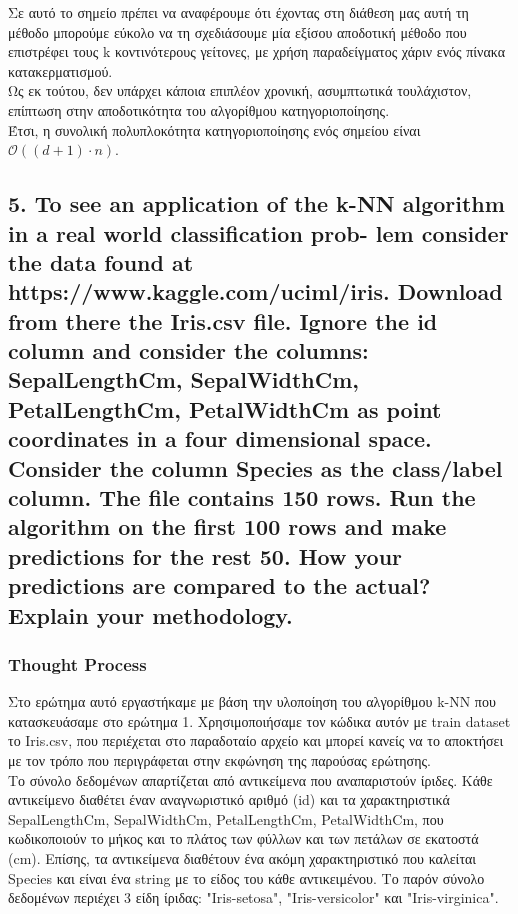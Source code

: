 \documentclass[12pt]{article}
\begin{document}
Σε αυτό το σημείο πρέπει να αναφέρουμε ότι έχοντας στη διάθεση μας
αυτή τη μέθοδο μπορούμε εύκολο να τη σχεδιάσουμε μία εξίσου αποδοτική μέθοδο
που επιστρέφει τους k κοντινότερους γείτονες, με χρήση
παραδείγματος χάριν ενός πίνακα κατακερματισμού. \\

Ως εκ τούτου, δεν υπάρχει κάποια επιπλέον χρονική,
ασυμπτωτικά τουλάχιστον, επίπτωση στην αποδοτικότητα του αλγορίθμου
κατηγοριοποίησης. \\

Έτσι, η συνολική πολυπλοκότητα κατηγοριοποίησης ενός σημείου είναι
\( \mathcal{O}((d + 1) \cdot n) \).

\pagebreak

\subsection*{5. To see an application of the k-NN algorithm in a real world classification prob-
	lem consider the data found at https://www.kaggle.com/uciml/iris. Download from there the
	Iris.csv file. Ignore the id column and consider the columns: SepalLengthCm, SepalWidthCm,
	PetalLengthCm, PetalWidthCm as point coordinates in a four dimensional space. Consider the
	column Species as the class/label column. The file contains 150 rows. Run the algorithm on
	the first 100 rows and make predictions for the rest 50. How your predictions are compared to
	the actual? Explain your methodology.}

\subsubsection*{Thought Process}

Στο ερώτημα αυτό εργαστήκαμε με βάση την υλοποίηση του αλγορίθμου k-NN που κατασκευάσαμε στο ερώτημα 1. Χρησιμοποιήσαμε τον κώδικα αυτόν με train dataset το Iris.csv, που περιέχεται στο παραδοταίο αρχείο και μπορεί κανείς να το αποκτήσει με τον τρόπο που περιγράφεται στην εκφώνηση της παρούσας ερώτησης. \\

Το σύνολο δεδομένων απαρτίζεται από αντικείμενα που αναπαριστούν ίριδες. Κάθε αντικείμενο διαθέτει έναν αναγνωριστικό αριθμό (id) και τα χαρακτηριστικά SepalLengthCm, SepalWidthCm, PetalLengthCm, PetalWidthCm, που κωδικοποιούν το μήκος και το πλάτος των φύλλων και των πετάλων σε εκατοστά (cm). Επίσης, τα αντικείμενα διαθέτουν ένα ακόμη χαρακτηριστικό που καλείται Species και είναι ένα string με το είδος του κάθε αντικειμένου. Το παρόν σύνολο δεδομένων περιέχει 3 είδη ίριδας: "Iris-setosa", "Iris-versicolor" και "Iris-virginica".
\end{document}
